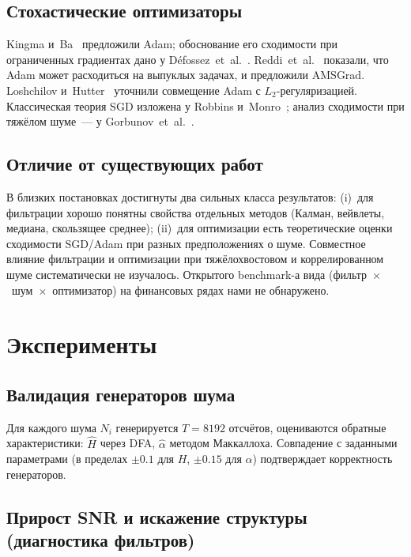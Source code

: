 \documentclass[conference]{IEEEtran}
\begin{document}
\subsection{Стохастические оптимизаторы}

Kingma и~Ba~\cite{kingma2015adam} предложили Adam; обоснование его
сходимости при ограниченных градиентах дано у
Défossez~et~al.~\cite{defossez2022adam}. Reddi~et~al.~\cite{reddi2018adam}
показали, что Adam может расходиться на выпуклых задачах, и предложили
AMSGrad. Loshchilov и~Hutter~\cite{loshchilov2019adamw} уточнили
совмещение Adam с $L_2$-регуляризацией. Классическая теория SGD изложена
у Robbins и~Monro~\cite{robbins1951sgd}; анализ сходимости при тяжёлом
шуме~--- у Gorbunov~et~al.~\cite{gorbunov2020clipping}.

\subsection{Отличие от существующих работ}

В близких постановках достигнуты два сильных класса результатов:
(i)~для фильтрации хорошо понятны свойства отдельных методов (Калман,
вейвлеты, медиана, скользящее среднее); (ii)~для оптимизации есть
теоретические оценки сходимости SGD/Adam при разных предположениях о
шуме. Совместное влияние фильтрации и оптимизации при тяжёлохвостовом и
коррелированном шуме систематически не изучалось. Открытого
benchmark-а вида (фильтр~$\times$~шум~$\times$~оптимизатор) на финансовых
рядах нами не обнаружено.

\section{Эксперименты}

\subsection{Валидация генераторов шума}

Для каждого шума $N_i$ генерируется $T=8192$ отсчётов, оцениваются
обратные характеристики: $\hat{H}$ через DFA, $\hat{\alpha}$ методом
Маккаллоха. Совпадение с заданными параметрами (в пределах $\pm0.1$
для $H$, $\pm0.15$ для $\alpha$) подтверждает корректность генераторов.

\subsection{Прирост SNR и искажение структуры (диагностика фильтров)}
\end{document}
